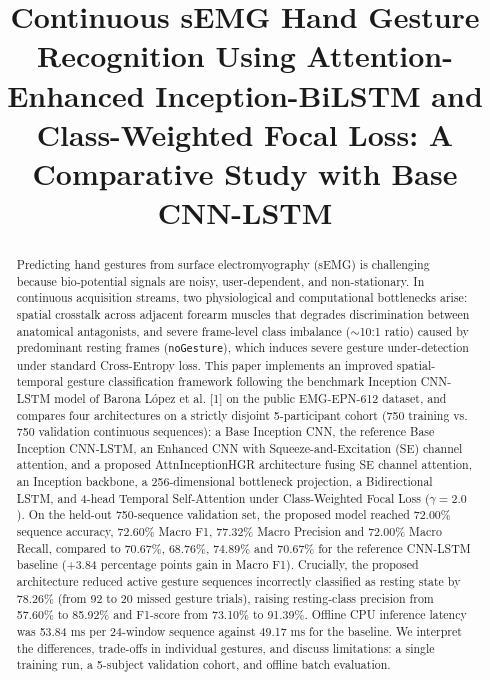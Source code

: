 \documentclass[conference]{IEEEtran}
\begin{document}
\title{Continuous sEMG Hand Gesture Recognition Using Attention-Enhanced Inception-BiLSTM and Class-Weighted Focal Loss: A Comparative Study with Base CNN-LSTM}

\author{
}

\maketitle

\begin{abstract}
Predicting hand gestures from surface electromyography (sEMG) is challenging because bio-potential signals are noisy, user-dependent, and non-stationary. In continuous acquisition streams, two physiological and computational bottlenecks arise: spatial crosstalk across adjacent forearm muscles that degrades discrimination between anatomical antagonists, and severe frame-level class imbalance ($\sim$10:1 ratio) caused by predominant resting frames (\texttt{noGesture}), which induces severe gesture under-detection under standard Cross-Entropy loss. This paper implements an improved spatial-temporal gesture classification framework following the benchmark Inception CNN-LSTM model of Barona L{\'o}pez et al. [1] on the public EMG-EPN-612 dataset, and compares four architectures on a strictly disjoint 5-participant cohort (750 training vs. 750 validation continuous sequences): a Base Inception CNN, the reference Base Inception CNN-LSTM, an Enhanced CNN with Squeeze-and-Excitation (SE) channel attention, and a proposed AttnInceptionHGR architecture fusing SE channel attention, an Inception backbone, a 256-dimensional bottleneck projection, a Bidirectional LSTM, and 4-head Temporal Self-Attention under Class-Weighted Focal Loss ($\gamma = 2.0$). On the held-out 750-sequence validation set, the proposed model reached 72.00\% sequence accuracy, 72.60\% Macro F1, 77.32\% Macro Precision and 72.00\% Macro Recall, compared to 70.67\%, 68.76\%, 74.89\% and 70.67\% for the reference CNN-LSTM baseline (+3.84 percentage points gain in Macro F1). Crucially, the proposed architecture reduced active gesture sequences incorrectly classified as resting state by 78.26\% (from 92 to 20 missed gesture trials), raising resting-class precision from 57.60\% to 85.92\% and F1-score from 73.10\% to 91.39\%. Offline CPU inference latency was 53.84 ms per 24-window sequence against 49.17 ms for the baseline. We interpret the differences, trade-offs in individual gestures, and discuss limitations: a single training run, a 5-subject validation cohort, and offline batch evaluation.
\end{abstract}
\end{document}
